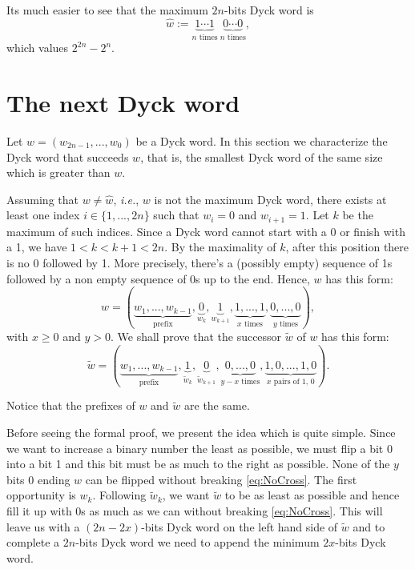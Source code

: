 \documentclass[a4paper]{article}
\begin{document}
Its much easier to see that the maximum $2n$-bits Dyck word is
\[
\hat w := \underbrace{1\cdots1}_{n\text{ times}}\ \underbrace{0\cdots0}_{n\text{ times}},
\]
which values $2^{2n} - 2^n$.



\section{The next Dyck word}

Let $w = (w_{2n - 1}, ..., w_0)$ be a Dyck word.
In this section we characterize the Dyck word that succeeds $w$, that is, the smallest Dyck word of the same size which is greater than $w$.

Assuming that $w\ne\hat w$, {\it i.e.}, $w$ is not the maximum Dyck word, there exists at least one index $i \in\{1, ..., 2n\}$ such that $w_i = 0$ and $w_{i + 1} = 1$.
Let $k$ be the maximum of such indices.
Since a Dyck word cannot start with a 0 or finish with a 1, we have $1 < k < k + 1 < 2n$.
By the maximality of $k$, after this position there is no 0 followed by 1.
More precisely, there's a (possibly empty) sequence of 1s followed by a non empty sequence of 0s up to the end.
Hence, $w$ has this form:
\[
w = (\underbrace{w_1, ..., w_{k - 1}}_{\text{prefix}}, \underbrace{0}_{w_k}, \underbrace{1}_{w_{k + 1}}, \underbrace{1, ..., 1}_{x\text{ times}}, \underbrace{0, ..., 0}_{y\text{ times}}),
\]
with $x\ge 0$ and $y > 0$.
We shall prove that the successor $\tilde w$ of $w$ has this form:
\[
\tilde w = (\underbrace{w_1, ..., w_{k - 1}}_{\text{prefix}}, \underbrace{1}_{\tilde w_{k}}, \underbrace{0}_{\tilde w_{k + 1}}, \underbrace{0, ..., 0}_{y - x\text{ times}}, \underbrace{1, 0, ..., 1, 0}_{x\text{ pairs of 1, 0}}).
\]

Notice that the prefixes of $w$ and $\tilde w$ are the same.

Before seeing the formal proof, we present the idea which is quite simple.
Since we want to increase a binary number the least as possible, we must flip a bit 0 into a bit 1 and this bit must be as much to the right as possible.
None of the $y$ bits 0 ending $w$ can be flipped without breaking \eqref{eq:NoCross}.
The first opportunity is $w_k$.
Following $\tilde w_k$, we want $\tilde w$ to be as least as possible and hence fill it up with 0s as much as we can without breaking \eqref{eq:NoCross}.
This will leave us with a $(2n - 2x)$-bits Dyck word on the left hand side of $\tilde w$ and to complete a $2n$-bits Dyck word we need to append the minimum $2x$-bits Dyck word.
\end{document}
